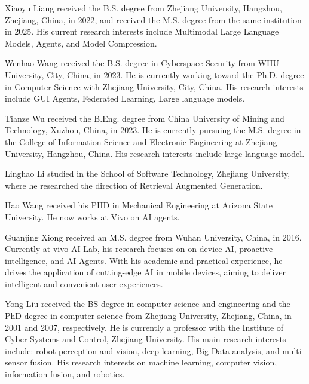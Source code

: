 \begin{IEEEbiography}{Xiaoyu Liang}
received the B.S. degree from Zhejiang University, Hangzhou, Zhejiang, China, in 2022, and received the M.S. degree from the same institution in 2025. His current research interests include Multimodal Large Language Models, Agents, and Model Compression.
\end{IEEEbiography}

\begin{IEEEbiography}{Wenhao Wang}
received the B.S. degree in Cyberspace Security from WHU University, City, China, in 2023. He is currently working toward the Ph.D. degree in Computer Science with Zhejiang University, City, China. His research interests include GUI Agents, Federated Learning, Large language models.
\end{IEEEbiography}

\begin{IEEEbiography}{Tianze Wu}
received the B.Eng. degree from China University of Mining and Technology, Xuzhou, China, in 2023. He is currently pursuing the M.S. degree in the College of Information Science and Electronic Engineering at Zhejiang University, Hangzhou, China. His research interests include large language model.
\end{IEEEbiography}

\begin{IEEEbiography}{Linghao Li}
studied in the School of Software Technology, Zhejiang University, where he researched the direction of Retrieval Augmented Generation.
\end{IEEEbiography}

\begin{IEEEbiography}{Hao Wang}
received his PHD in Mechanical Engineering at Arizona State University. He now works at Vivo on AI agents.
\end{IEEEbiography}

\begin{IEEEbiography}{Guanjing Xiong}
received an M.S. degree from Wuhan University, China, in 2016. Currently at vivo AI Lab, his research focuses on on-device AI, proactive intelligence, and AI Agents. With his academic and practical experience, he drives the application of cutting-edge AI in mobile devices, aiming to deliver intelligent and convenient user experiences.
\end{IEEEbiography}

\begin{IEEEbiography}{Yong Liu}
received the BS degree in computer science and engineering and the PhD degree in computer science from Zhejiang University, Zhejiang, China, in 2001 and 2007, respectively. He is currently a professor with the Institute of Cyber-Systems and Control, Zhejiang University. His main research interests include: robot perception and vision, deep learning, Big Data analysis, and multi-sensor fusion. His research interests on machine learning, computer vision, information fusion, and robotics.
\end{IEEEbiography}

